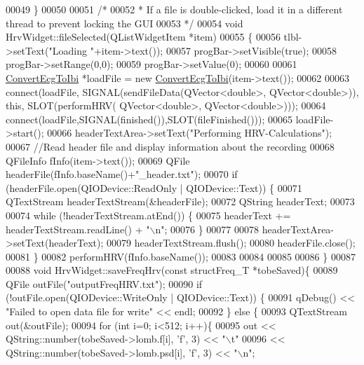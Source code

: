 \begin{DoxyCode}
00049 \}
00050 
00051 \textcolor{comment}{/*}
00052 \textcolor{comment}{ * If a file is double-clicked, load it in a different thread to prevent locking the GUI}
00053 \textcolor{comment}{ */}
00054 \textcolor{keywordtype}{void} HrvWidget::fileSelected(QListWidgetItem *item)
00055 \{
00056     tlbl->setText(\textcolor{stringliteral}{"Loading "}+item->text());
00057     progBar->setVisible(\textcolor{keyword}{true});
00058     progBar->setRange(0,0);
00059     progBar->setValue(0);
00060 
00061     \hyperlink{classConvertEcgToIbi}{ConvertEcgToIbi} *loadFile = \textcolor{keyword}{new} \hyperlink{classConvertEcgToIbi}{ConvertEcgToIbi}(item->text());
00062 
00063     connect(loadFile, SIGNAL(sendFileData(QVector<double>, QVector<double>)), \textcolor{keyword}{this}, SLOT(performHRV(
      QVector<double>, QVector<double>)));
00064     connect(loadFile,SIGNAL(finished()),SLOT(fileFinished()));
00065     loadFile->start();
00066     headerTextArea->setText(\textcolor{stringliteral}{"Performing HRV-Calculations"});
00067     \textcolor{comment}{//Read header file and display information about the recording}
00068     QFileInfo fInfo(item->text());
00069     QFile headerFile(fInfo.baseName()+\textcolor{stringliteral}{"\_header.txt"});
00070     \textcolor{keywordflow}{if} (headerFile.open(QIODevice::ReadOnly | QIODevice::Text)) \{
00071         QTextStream headerTextStream(&headerFile);
00072         QString headerText;
00073 
00074         \textcolor{keywordflow}{while} (!headerTextStream.atEnd()) \{
00075             headerText += headerTextStream.readLine() + \textcolor{stringliteral}{"\(\backslash\)n"};
00076         \}
00077 
00078         headerTextArea->setText(headerText);
00079         headerTextStream.flush();
00080         headerFile.close();
00081     \}
00082     performHRV(fInfo.baseName());
00083 
00084 
00085 
00086 \}
00087 
00088 \textcolor{keywordtype}{void} HrvWidget::saveFreqHrv(\textcolor{keyword}{const} structFreq\_T *tobeSaved)\{
00089     QFile outFile(\textcolor{stringliteral}{"outputFreqHRV.txt"});
00090     \textcolor{keywordflow}{if} (!outFile.open(QIODevice::WriteOnly | QIODevice::Text)) \{
00091         qDebug() << \textcolor{stringliteral}{"Failed to open data file for write"} << endl;
00092     \} \textcolor{keywordflow}{else} \{
00093         QTextStream out(&outFile);
00094         \textcolor{keywordflow}{for} (\textcolor{keywordtype}{int} i=0; i<512; i++)\{
00095             out << QString::number(tobeSaved->lomb.f[i], \textcolor{charliteral}{'f'}, 3) << \textcolor{stringliteral}{"\(\backslash\)t"}
00096                     << QString::number(tobeSaved->lomb.psd[i], \textcolor{charliteral}{'f'}, 3) << \textcolor{stringliteral}{"\(\backslash\)n"};

\end{DoxyCode}
